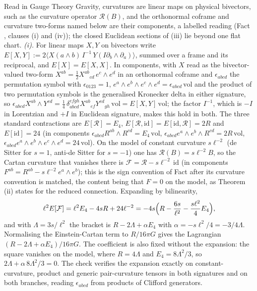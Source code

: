 Read in Gauge Theory Gravity, curvatures are linear maps on physical bivectors, such as the curvature operator $\mathcal{R}(B)$, and the orthonormal coframe and curvature two-forms named below are their components, a labelled reading (Fact , clauses (i) and (iv)); the closed Euclidean sections of (iii) lie beyond one flat chart. \emph{(i).} For linear maps $X, Y$ on bivectors write $E[X, Y] := 2\langle X(a\wedge b)\,I^{-1}\,Y(I\partial_b\wedge\partial_a)\rangle$, summed over a frame and its reciprocal, and $E[X] = E[X, X]$. In components, with $X$ read as the bivector-valued two-form $X^{ab} = \tfrac12 X^{ab}{}_{cd}\,e^{c}\wedge e^{d}$ in an orthonormal coframe and $\epsilon_{abcd}$ the permutation symbol with $\epsilon_{0123} = 1$, $e^{a}\wedge e^{b}\wedge e^{c}\wedge e^{d} = \epsilon_{abcd}\,\mathrm{vol}$ and the product of two permutation symbols is the generalised Kronecker delta in either signature, so $\epsilon_{abcd}X^{ab}\wedge Y^{cd} = \tfrac14\,\delta^{efgh}_{abcd}X^{ab}{}_{ef}Y^{cd}{}_{gh}\,\mathrm{vol} = E[X, Y]\,\mathrm{vol}$; the factor $I^{-1}$, which is $-I$ in Lorentzian and $+I$ in Euclidean signature, makes this hold in both. The three standard contractions are $E[\mathcal{R}] = E_{4}$, $E[\mathcal{R}, \mathrm{id}] = E[\mathrm{id}, \mathcal{R}] = 2R$ and $E[\mathrm{id}] = 24$ (in components $\epsilon_{abcd}R^{ab}\wedge R^{cd} = E_{4}\,\mathrm{vol}$, $\epsilon_{abcd}e^{a}\wedge e^{b}\wedge R^{cd} = 2R\,\mathrm{vol}$, $\epsilon_{abcd}e^{a}\wedge e^{b}\wedge e^{c}\wedge e^{d} = 24\,\mathrm{vol}$). On the model of constant curvature $s\ell^{-2}$ (de Sitter for $s = 1$, anti-de Sitter for $s = -1$) one has $\mathcal{R}(B) = s\ell^{-2}B$, so the Cartan curvature that vanishes there is $\mathcal{F} = \mathcal{R} - s\ell^{-2}\,\mathrm{id}$ (in components $F^{ab} = R^{ab} - s\ell^{-2}e^{a}\wedge e^{b}$); this is the sign convention of Fact  after its curvature convention is matched, the content being that $F = 0$ on the model, as Theorem (ii) states for the reduced connection. Expanding by bilinearity,
\[
\ell^{2}E[\mathcal{F}] = \ell^{2}E_{4} - 4sR + 24\ell^{-2} = -4s\Bigl(R - \frac{6s}{\ell^{2}} - \frac{s\ell^{2}}{4}E_{4}\Bigr),
\]
and with $\Lambda = 3s/\ell^{2}$ the bracket is $R - 2\Lambda + \alpha E_{4}$ with $\alpha = -s\ell^{2}/4 = -3/4\Lambda$. Normalising the Einstein-Cartan term to $R/16\pi G$ gives the Lagrangian $(R - 2\Lambda + \alpha E_{4})/16\pi G$. The coefficient is also fixed without the expansion: the square vanishes on the model, where $R = 4\Lambda$ and $E_{4} = 8\Lambda^{2}/3$, so $2\Lambda + \alpha\,8\Lambda^{2}/3 = 0$. The check verifies the expansion exactly on constant-curvature, product and generic pair-curvature tensors in both signatures and on both branches, reading $\epsilon_{abcd}$ from products of Clifford generators.

